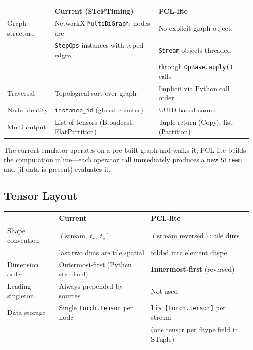 \documentclass[11pt]{article}
\begin{document}
\begin{center}
\begin{tabular}{lll}
\toprule
& \textbf{Current (STePTiming)} & \textbf{PCL-lite} \\
\midrule
Graph structure  & NetworkX \texttt{MultiDiGraph}; nodes are & No explicit graph object; \\
                 & \texttt{StepOps} instances with typed edges & \texttt{Stream} objects threaded \\
                 &                                             & through \texttt{OpBase.apply()} calls \\
Traversal        & Topological sort over graph & Implicit via Python call order \\
Node identity    & \texttt{instance\_id} (global counter) & UUID-based names \\
Multi-output     & List of tensors (Broadcast, FlatPartition) & Tuple return (Copy), list (Partition) \\
\bottomrule
\end{tabular}
\end{center}

The current emulator operates on a pre-built graph and walks it; PCL-lite builds the computation inline---each operator call immediately produces a new \texttt{Stream} and (if data is present) evaluates it.

\subsection{Tensor Layout}

\begin{center}
\begin{tabular}{lll}
\toprule
& \textbf{Current} & \textbf{PCL-lite} \\
\midrule
Shape convention & $(\text{stream},\; t_r,\; t_c)$  & $(\text{stream reversed})$; tile dims \\
                 & last two dims are tile spatial     & folded into element dtype \\
Dimension order  & Outermost-first (Python standard) & \textbf{Innermost-first} (reversed) \\
Leading singleton & Always prepended by sources & Not used \\
Data storage     & Single \texttt{torch.Tensor} per node & \texttt{list[torch.Tensor]} per stream \\
                 &                                       & (one tensor per dtype field in STuple) \\
\bottomrule
\end{tabular}
\end{center}
\end{document}
